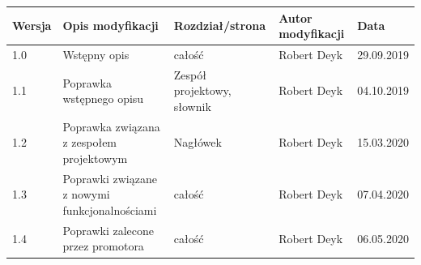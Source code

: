 \documentclass[a4paper,11pt]{report}
\begin{document}
\begin{tabular}{|p{2.5cm}|p{3cm}|p{3cm}|p{2.5cm}|p{2.5cm}|}
\hline
\textbf{Wersja} & \textbf{Opis modyfikacji} & \textbf{Rozdział/strona} & \textbf{Autor modyfikacji} & \textbf{Data}\\
\hline
1.0 & Wstępny opis & całość & Robert Deyk & 29.09.2019\\
\hline
1.1 & Poprawka wstępnego opisu & Zespół projektowy, słownik & Robert Deyk & 04.10.2019\\
\hline
1.2 & Poprawka związana z zespołem projektowym & Nagłówek & Robert Deyk & 15.03.2020\\
\hline
1.3 & Poprawki związane z nowymi funkcjonalnościami & całość & Robert Deyk & 07.04.2020\\
\hline
1.4 & Poprawki zalecone przez promotora & całość & Robert Deyk & 06.05.2020\\
\hline
\end{tabular}\\
\end{document}
